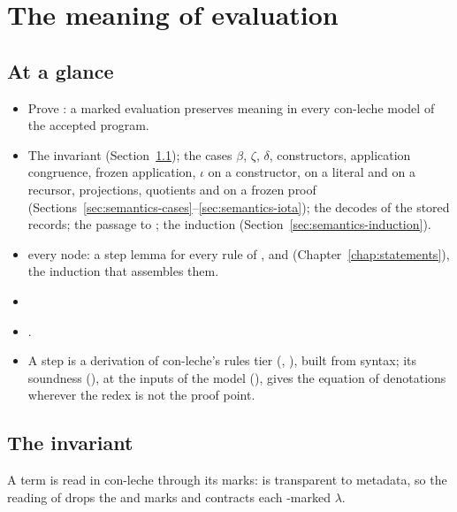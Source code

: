 \chapter{The meaning of evaluation}\label{chap:semantics}

\section*{At a glance}
\begin{itemize}
\item {} Prove : a marked evaluation preserves meaning in every con-leche model of the accepted program.
\item {} The invariant  (Section~\ref{sec:semantics-inv}); the cases $\beta$, $\zeta$, $\delta$, constructors, application congruence, frozen application, $\iota$ on a constructor, on a  literal and on a recursor, projections, quotients and  on a frozen proof (Sections~\ref{sec:semantics-cases}--\ref{sec:semantics-iota}); the decodes of the stored records; the passage to ; the induction (Section~\ref{sec:semantics-induction}).
\item {} \stProved{} every node: a step lemma for every rule of , and \hl{} (Chapter~\ref{chap:statements}), the induction that assembles them.
\item {} 
\item {} .
\item {} A step is a derivation of con-leche's rules tier (, ), built from syntax; its soundness  (), at the inputs of the model (), gives the equation of denotations wherever the redex is not the proof point.
\end{itemize}

\section{The invariant}\label{sec:semantics-inv}

A term is read in con-leche through its marks:  is transparent to metadata, so the reading of  drops the  and  marks and contracts each -marked $\lambda$.

